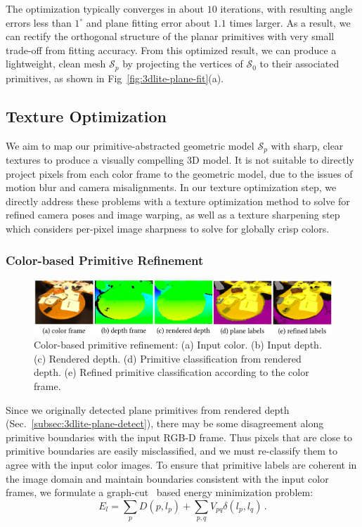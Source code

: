 The optimization typically converges in about $10$ iterations, with resulting angle errors less than $1^{\circ}$ and plane fitting error about $1.1$ times larger. 
As a result, we can rectify the orthogonal structure of the planar primitives with very small trade-off from fitting accuracy.
From this optimized result, we can produce a lightweight, clean mesh $\mathcal{S}_p$ by projecting the vertices of $\mathcal{S}_0$ to their associated primitives, as shown in Fig~\ref{fig:3dlite-plane-fit}(a). 

\subsection{Texture Optimization}
\label{sec:approach-texture}

We aim to map our primitive-abstracted geometric model $\mathcal{S}_p$ with sharp, clear textures to produce a visually compelling 3D model.
It is not suitable to directly project pixels from each color frame to the geometric model, due to the issues of motion blur and camera misalignments.
In our texture optimization step, we directly address these problems with a texture optimization method to solve for refined camera poses and image warping, as well as a texture sharpening step which considers per-pixel image sharpness to solve for globally crisp colors.

\subsubsection{Color-based Primitive Refinement}
\label{subsec:color-plane-refine}
\begin{figure}
    \centering
    \includegraphics[width=\linewidth]{3dlite/fig4.png}
    \caption{Color-based primitive refinement: (a) Input color. (b) Input depth. (c) Rendered depth. (d) Primitive classification from rendered depth. (e) Refined primitive classification according to the color frame.}
    \label{fig:3dlite-color-boundary-refine}
\end{figure}
Since we originally detected plane primitives from rendered depth (Sec.~\ref{subsec:3dlite-plane-detect}), there may be some disagreement along primitive boundaries with the input RGB-D frame.
Thus pixels that are close to primitive boundaries are easily misclassified, and we must re-classify them to agree with the input color images. 
To ensure that primitive labels are coherent in the image domain and maintain boundaries consistent with the input color frames, we formulate a graph-cut~\cite{boykov2001fast} based energy minimization problem:
\begin{equation}
E_l = \sum_p D(p, l_p) + \sum_{p,q} V_{pq}\delta(l_p,l_q)\,.
\label{eq:color-boundary-refine}
\end{equation}

